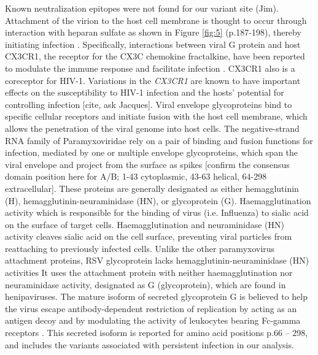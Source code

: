 \documentclass{article}
\begin{document}
Known neutralization epitopes were not found for our variant site (Jim).
Attachment of the virion to the host cell membrane is thought to occur through interaction with heparan sulfate as shown in Figure \ref{fig:5}
(p.187-198), thereby initiating infection 
\cite{levine1987demonstration, feldman1999identification, feldman2000fusion}.
Specifically, interactions between viral G protein and host CX3CR1, the receptor for the CX3C chemokine fractalkine, have been reported to modulate the immune response and facilitate infection 
\cite{johnson2015respiratory, tripp2001cx3c, jeong2015cx3cr1}.
CX3CR1 also is a coreceptor for HIV-1. 
Variations in the \textit{CX3CR1} are known to have important effects on the susceptibility to HIV-1 infection and the hosts' potential for controlling infection [cite, ask Jacques].
Viral envelope glycoproteins bind to specific cellular receptors and initiate fusion with the host cell membrane, 
which allows the penetration of the viral genome into host cells. 
The negative-strand RNA family of Paramyxoviridae rely on a pair of binding and fusion functions for infection, mediated by one or multiple envelope glycoproteins,
which span the viral envelope and project from the surface as spikes [confirm the consensus domain position here for A/B; 1-43 cytoplasmic, 43-63 helical, 64-298 extracellular].
These proteins are generally designated as either hemagglutinin (H), hemagglutinin-neuraminidase (HN), or glycoprotein (G). 
Haemagglutination activity which is responsible for the binding of virus (i.e. Influenza) to sialic acid on the surface of target cells.
Haemagglutination and neuraminidase (HN) activity cleaves sialic acid on the cell surface, preventing viral particles from reattaching to previously infected cells. 
Unlike the other paramyxovirus attachment proteins, 
RSV glycoprotein lacks hemagglutinin-neuraminidase (HN) activities
It uses the attachment protein with neither haemagglutination nor neuraminidase activity, designated as G (glycoprotein), which are found in henipaviruses.
\cite{takimoto2002role, malvoisin1993measles, hu1992functional, horvath1992biological, bousse1994regions}
The mature isoform of secreted glycoprotein G is believed to help the virus escape antibody-dependent restriction of replication by acting as an antigen decoy and by modulating the activity of leukocytes bearing Fc-gamma receptors 
\cite{bukreyev2008secreted}.
This secreted isoform is reported for amino acid positions p.66 – 298, and includes the variants associated with persistent infection in our analysis. 
\end{document}
